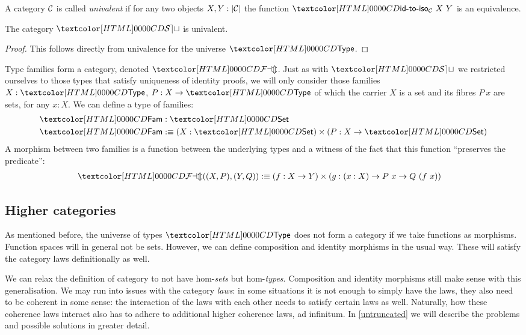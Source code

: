 \begin{definition}
  A category $\mathcal{C}$ is called \emph{univalent} if for any two objects
  $X, Y : | \mathcal{C} |$ the function $\idtoiso_{\Cc}\ X\ Y$ is an
  equivalence.
\end{definition}

\begin{proposition}
  The category $\SET$ is univalent.
\end{proposition}

\begin{proof}
  This follows directly from univalence for the universe $\Type$.
\end{proof}

\begin{example}
  Type families form a category, denoted $\FAM$. Just as with $\SET$
  we restricted ourselves to those types that satisfy uniqueness of
  identity proofs, we will only consider those families $X : \Type$,
  $P : X \to \Type$ of which the carrier $X$ is a set and its fibres
  $P\ x$ are sets, for any $x : X$. We can define a type of families:
  \begin{align*}
    &\Fam : \Set \\
    &\Fam \ddefeq (X : \Set) \times (P : X \to \Set)
  \end{align*}
  A morphism between two families is a function between the underlying
  types and a witness of the fact that this function ``preserves the
  predicate'':
  \begin{align*}
    &\FAM((X,P),(Y,Q)) \ddefeq (f : X \to Y) \times (g : (x : X) \to P\ x \to Q\ (f\ x))
  \end{align*}
\end{example}

\subsection{Higher categories}
\label{higher-cats}

As mentioned before, the universe of types $\Type$ does not form a
category if we take functions as morphisms. Function spaces will in
general not be sets. However, we can define composition and identity
morphisms in the usual way. These will satisfy the category laws
definitionally as well.

We can relax the definition of category to not have hom-\emph{sets}
but hom-\emph{types}. Composition and identity morphisms still make
sense with this generalisation. We may run into issues with the
category \emph{laws}: in some situations it is not enough to simply
have the laws, they also need to be coherent in some sense: the
interaction of the laws with each other needs to satisfy certain laws
as well. Naturally, how these coherence laws interact also has to
adhere to additional higher coherence laws, ad infinitum. In
\cref{untruncated} we will describe the problems and possible
solutions in greater detail.

